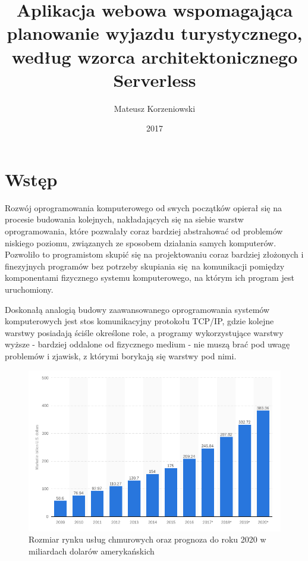 \documentclass[oneside]{mgr}
\author{Mateusz Korzeniowski}
\title{Aplikacja webowa wspomagająca planowanie wyjazdu turystycznego, według wzorca architektonicznego Serverless}
\date{2017}
\begin{document}
\maketitle
\tableofcontents

\chapter{Wstęp}
Rozwój oprogramowania komputerowego od swych początków opierał się na procesie budowania kolejnych, nakładających się na siebie warstw oprogramowania, które pozwalały coraz bardziej abstrahować od problemów niskiego poziomu, związanych ze sposobem działania samych komputerów. Pozwoliło to programistom skupić się na projektowaniu coraz bardziej złożonych i finezyjnych programów bez potrzeby skupiania się na komunikacji pomiędzy komponentami fizycznego systemu komputerowego, na którym ich program jest uruchomiony.

Doskonałą analogią budowy zaawansowanego oprogramowania systemów komputerowych jest stos komunikacyjny protokołu TCP/IP, gdzie kolejne warstwy posiadają ściśle określone role, a programy wykorzystujące warstwy wyższe - bardziej oddalone od fizycznego medium - nie muszą brać pod uwagę problemów i zjawisk, z którymi borykają się warstwy pod nimi.

\begin{figure}
	\centering
	\includegraphics[width=15cm]{2017-03-1910:36:22}
	\caption{Rozmiar rynku usług chmurowych oraz prognoza do roku 2020 w miliardach dolarów amerykańskich \cite{statisticCloudComputingMarketSize}}
	\label{fig:cloudComputingMarketSize}
\end{figure}
\end{document}
